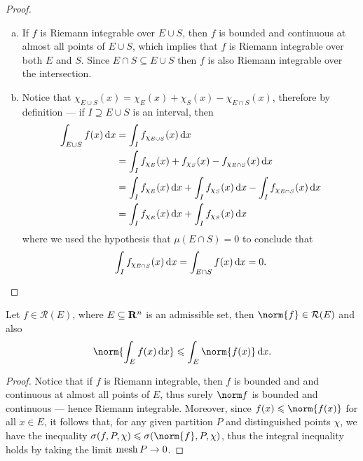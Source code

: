 \begin{proof}
\begin{enumerate}[(a)]\setlength\itemsep{0em}
\item If \(f\) is Riemann integrable over \(E \cup S\), then \(f\) is bounded
  and continuous at almost all points of \(E \cup S\), which implies that \(f\)
  is Riemann integrable over both \(E\) and \(S\). Since \(E \cap S \subseteq E
  \cup S\) then \(f\) is also Riemann integrable over the intersection.
\item Notice that \(\chi_{E \cup S}(x) = \chi_{E}(x) + \chi_S(x) - \chi_{E \cap
  S}(x)\), therefore by definition --- if \(I \supseteq E \cup S\) is an
  interval, then
  \begin{align*}
    \int_{E \cup S} f(x)\, \mathrm{d} x
    &= \int_{I} f_{\chi_{E \cup S}}(x)\, \mathrm{d} x \\
    &= \int_I f_{\chi_E}(x) + f_{\chi_S}(x) - f_{\chi_{E \cap S}}(x)\, \mathrm{d} x \\
    &= \int_I f_{\chi_E}(x)\, \mathrm{d} x
      + \int_{I} f_{\chi_S}(x)\, \mathrm{d} x
      - \int_I f_{\chi_{E \cap S}}(x)\, \mathrm{d} x \\
    &= \int_I f_{\chi_E}(x)\, \mathrm{d} x
      + \int_{I} f_{\chi_S}(x)\, \mathrm{d} x
  \end{align*}
  where we used the hypothesis that \(\mu(E \cap S) = 0\) to conclude that
  \[
    \int_I f_{\chi_{E \cap S}}(x)\, \mathrm{d} x
    = \int_{E \cap S} f(x)\, \mathrm{d} x = 0.
  \]
\end{enumerate}
\end{proof}

\begin{proposition}[Estimate]
\label{prop:norm-of-integral-less-integral-of-norm}
Let \(f \in \mathcal R(E)\), where \(E \subseteq \mathbf{R}^{n}\) is an admissible set,
then \(\norm{f} \in \mathcal R(E)\) and also
\[
  \norm{\int_E f(x)\, \diff x} \leq \int_E \norm{f(x)}\, \diff x.
\]
\end{proposition}

\begin{proof}
Notice that if \(f\) is Riemann integrable, then \(f\) is bounded and and
continuous at almost all points of \(E\), thus surely \(\norm f\) is bounded and
continuous --- hence Riemann integrable. Moreover, since \(f(x) \leq
\norm{f(x)}\) for all \(x \in E\), it follows that, for any given partition
\(P\) and distinguished points \(\chi\), we have the inequality \(\sigma(f, P,
\chi) \leq \sigma(\norm{f}, P, \chi)\), thus the integral inequality holds by
taking the limit \(\operatorname{mesh} P \to 0\).
\end{proof}

